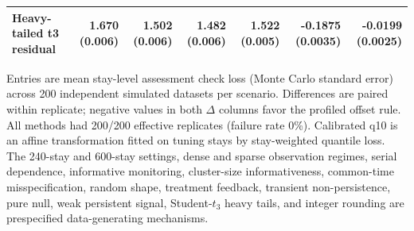 \begin{table}[!htbp]
{\begin{tabular}{lrrrrrr}
Heavy-tailed t3 residual & 1.670 (0.006) & 1.502 (0.006) & 1.482 (0.006) & 1.522 (0.005) & -0.1875 (0.0035) & -0.0199 (0.0025)\\
\hline
\end{tabular}%
}
\par\smallskip
\footnotesize{Entries are mean stay-level assessment check loss (Monte Carlo standard error) across 200 independent simulated datasets per scenario. Differences are paired within replicate; negative values in both $\Delta$ columns favor the profiled offset rule. All methods had 200/200 effective replicates (failure rate 0\%). Calibrated q10 is an affine transformation fitted on tuning stays by stay-weighted quantile loss. The 240-stay and 600-stay settings, dense and sparse observation regimes, serial dependence, informative monitoring, cluster-size informativeness, common-time misspecification, random shape, treatment feedback, transient non-persistence, pure null, weak persistent signal, Student-$t_3$ heavy tails, and integer rounding are prespecified data-generating mechanisms.}
\end{table}
